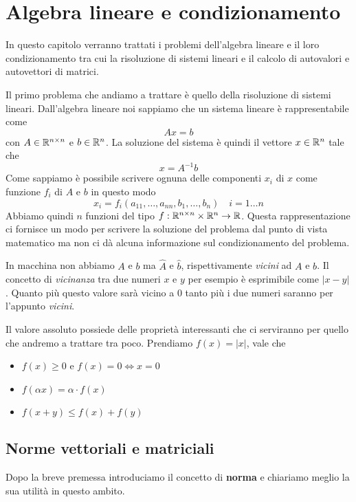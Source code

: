 \chapter{Algebra lineare e condizionamento}
In questo capitolo verranno trattati i problemi dell'algebra lineare e il loro condizionamento tra cui la
risoluzione di sistemi lineari e il calcolo di autovalori e autovettori di matrici.

Il primo problema che andiamo a trattare è quello della risoluzione di sistemi lineari. Dall'algebra lineare
noi sappiamo che un sistema lineare è rappresentabile come
\[ A x = b \]
con $A \in \mathbb{R}^{n \times n}$ e $b \in \mathbb{R}^n$. La soluzione del sistema è quindi il vettore $x \in \mathbb{R}^n$ tale che
\[ x = A^{-1} b \]
Come sappiamo è possibile scrivere ognuna delle componenti $x_i$ di $x$ come funzione $f_i$ di $A$ e $b$ in
questo modo
\[ x_i = f_i (a_{11}, \dots, a_{nn}, b_1, \dots, b_n) \quad i = 1 \dots n \]
Abbiamo quindi $n$ funzioni del tipo $f : \mathbb{R}^{n \times n} \times \mathbb{R}^n \to \mathbb{R}$. Questa rappresentazione ci
fornisce un modo per scrivere la soluzione del problema dal punto di vista matematico ma non ci dà alcuna
informazione sul condizionamento del problema.

In macchina non abbiamo $A$ e $b$ ma $\hat{A}$ e $\hat{b}$, rispettivamente \emph{vicini} ad $A$ e $b$. Il
concetto di \emph{vicinanza} tra due numeri $x$ e $y$ per esempio è esprimibile come $|x - y|$. Quanto più
questo valore sarà vicino a 0 tanto più i due numeri saranno per l'appunto \emph{vicini}.

Il valore assoluto possiede delle proprietà interessanti che ci serviranno per quello che andremo a trattare
tra poco. Prendiamo $f(x) = |x|$, vale che
\begin{itemize}
	\item $f(x) \geq 0$ e $f(x) = 0 \Leftrightarrow x = 0$
	\item $f(\alpha x) = \alpha \cdot f(x)$
	\item $f(x + y) \leq f(x) + f(y)$
\end{itemize}

\section{Norme vettoriali e matriciali}
Dopo la breve premessa introduciamo il concetto di \textbf{norma} e chiariamo meglio la sua utilità in questo
ambito.

